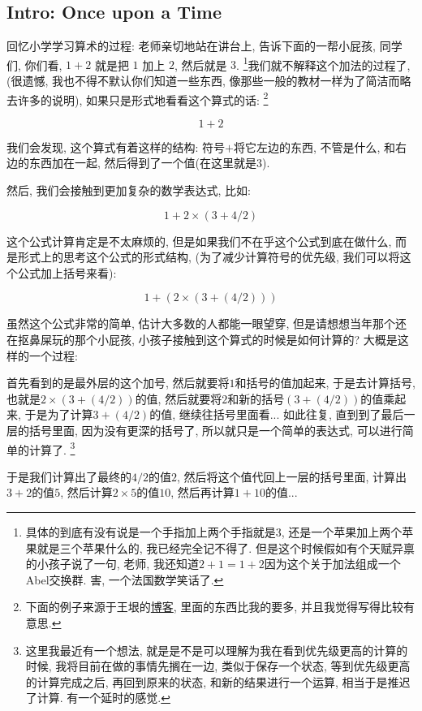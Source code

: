 \subsection{Intro: Once upon a Time}
回忆小学学习算术的过程: 老师亲切地站在讲台上, 告诉下面的一帮小屁孩, 同学们, 你们看, $1 + 2$ 就是把 $1$ 加上 $2$, 然后就是 $3$. \footnote{具体的到底有没有说是一个手指加上两个手指就是$3$, 还是一个苹果加上两个苹果就是三个苹果什么的, 我已经完全记不得了. 但是这个时候假如有个天赋异禀的小孩子说了一句, 老师, 我还知道$2+1=1+2$因为这个关于加法组成一个Abel交换群. 害, 一个法国数学笑话了. }我们就不解释这个加法的过程了, (很遗憾, 我也不得不默认你们知道一些东西, 像那些一般的教材一样为了简洁而略去许多的说明), 如果只是形式地看看这个算式的话: \footnote{下面的例子来源于王垠的\href{http://www.yinwang.org/blog-cn/2018/04/13/computer-science}{博客}, 里面的东西比我的要多, 并且我觉得写得比较有意思. }

$$ 1 + 2 $$

我们会发现, 这个算式有着这样的结构: 符号$+$将它左边的东西, 不管是什么, 和右边的东西加在一起, 然后得到了一个值(在这里就是$3$). 

然后, 我们会接触到更加复杂的数学表达式, 比如: 

$$1 + 2 \times (3 + 4 / 2)$$

这个公式计算肯定是不太麻烦的, 但是如果我们不在乎这个公式到底在做什么, 而是形式上的思考这个公式的形式结构, (为了减少计算符号的优先级, 我们可以将这个公式加上括号来看): 

$$1 + (2 \times (3 + (4 / 2)))$$

虽然这个公式非常的简单, 估计大多数的人都能一眼望穿, 但是请想想当年那个还在抠鼻屎玩的那个小屁孩, 小孩子接触到这个算式的时候是如何计算的? 大概是这样的一个过程: 

首先看到的是最外层的这个加号, 然后就要将$1$和括号的值加起来, 于是去计算括号, 也就是$2 \times (3 + (4 / 2))$的值, 然后就要将$2$和新的括号$(3 + (4 / 2))$的值乘起来, 于是为了计算$3 + (4 / 2)$的值, 继续往括号里面看... 如此往复, 直到到了最后一层的括号里面, 因为没有更深的括号了, 所以就只是一个简单的表达式, 可以进行简单的计算了. \footnote{这里我最近有一个想法, 就是是不是可以理解为我在看到优先级更高的计算的时候, 我将目前在做的事情先搁在一边, 类似于保存一个状态, 等到优先级更高的计算完成之后, 再回到原来的状态, 和新的结果进行一个运算, 相当于是推迟了计算. 有一个延时的感觉. }

于是我们计算出了最终的$4 / 2$的值$2$, 然后将这个值代回上一层的括号里面, 计算出$3 + 2$的值$5$, 然后计算$2 \times 5$的值$10$, 然后再计算$1 + 10$的值... \\

